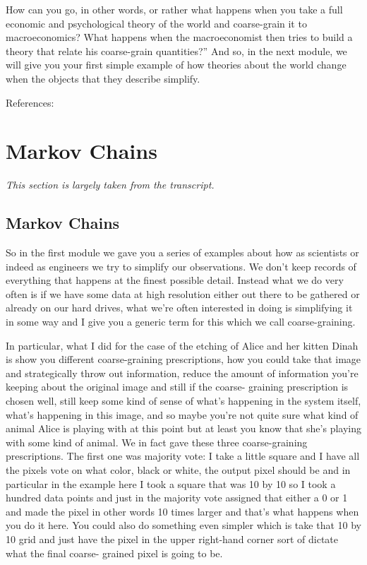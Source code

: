 \documentclass[]{article}
\begin{document}
How can you go, in other words, or rather what happens when you take
a full economic and psychological theory of the world
and coarse-grain it to macroeconomics? What happens when the macroeconomist
then tries to build a theory that relate his coarse-grain quantities?''
And so, in the next module, we will give you your first simple example
of how theories about the world change when the objects
that they describe simplify.

References: \cite{dedeo2018information,dedeo2013bootstrap,dedeo201716}

\section{Markov Chains}

\textit{This section is largely taken from the transcript.}

\subsection{Markov Chains}

So in the first module we gave you a series of examples about how as
scientists or indeed as engineers we try to simplify our observations. We don't
keep records of everything that happens at the finest possible detail. Instead
what we do very often is if we have some data at high resolution either out there
to be gathered or already on our hard drives, what we're often interested in
doing is simplifying it in some way and I give you a generic term for this which
we call coarse-graining.

In particular, what I did for the case of the etching
of Alice and her kitten Dinah is show you different coarse-graining
prescriptions, how you could take that image and strategically throw out
information, reduce the amount of
information you're keeping about the
original image and still if the coarse-
graining prescription is chosen well,
still keep some kind of sense of what's
happening in the system itself, what's
happening in this image, and so  maybe
you're not quite sure what kind of
animal Alice is playing with at this
point but at least you know that she's
playing with some kind of animal. We in
fact gave these three coarse-graining
prescriptions. The first one was majority
vote: I take a little square and I have
all the pixels vote on what color, black
or white, the output pixel should be and
in particular in the example here I took
a square that was 10 by 10 so I took a
hundred data points and just in the
majority vote assigned that either a 0
or 1 and made the pixel in other words
10 times larger and that's what happens
when you do it here. You could also do
something even simpler which is take
that 10 by 10 grid and just have the
pixel in the upper right-hand corner
sort of dictate what the final coarse-
grained pixel is going to be.
\end{document}
